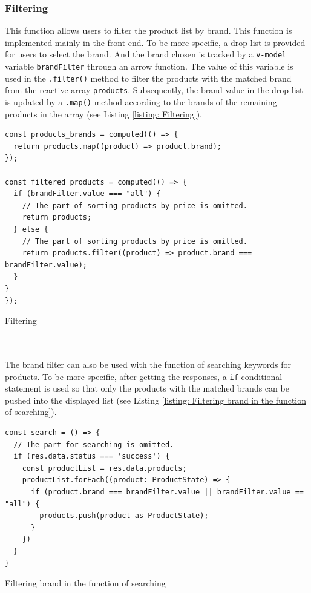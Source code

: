 \documentclass{article}
\begin{document}
\subsubsection{Filtering}
This function allows users to filter the product list by brand. This function is implemented mainly in the front end. To be more specific, a drop-list is provided for users to select the brand. And the brand chosen is tracked by a \verb|v-model| variable \verb|brandFilter| through an arrow function. The value of this variable is used in the \verb|.filter()| method to filter the products with the matched brand from the reactive array \verb|products|. Subsequently, the brand value in the drop-list is updated by a \verb|.map()| method according to the brands of the remaining products in the array (see Listing \ref{listing: Filtering}). 
\begin{listing}[!htp]
\begin{verbatim}
const products_brands = computed(() => {
  return products.map((product) => product.brand);
});

const filtered_products = computed(() => {
  if (brandFilter.value === "all") {
    // The part of sorting products by price is omitted.
    return products;
  } else {
    // The part of sorting products by price is omitted.
    return products.filter((product) => product.brand === brandFilter.value);
  }
}
});
\end{verbatim}
\caption{Filtering}
\label{listing: Filtering}
\end{listing}\\\\
The brand filter can also be used with the function of searching keywords for products. To be more specific, after getting the responses, a \verb|if| conditional statement is used so that only the products with the matched brands can be pushed into the displayed list (see Listing \ref{listing: Filtering brand in the function of searching}).
\begin{listing}[!htp]
\begin{verbatim}
const search = () => {
  // The part for searching is omitted.
  if (res.data.status === 'success') {
    const productList = res.data.products;
    productList.forEach((product: ProductState) => {
      if (product.brand === brandFilter.value || brandFilter.value == "all") {
        products.push(product as ProductState);
      }
    })
  }
}
\end{verbatim}
\caption{Filtering brand in the function of searching}
\label{listing: Filtering brand in the function of searching}
\end{listing}
\newpage
\end{document}
